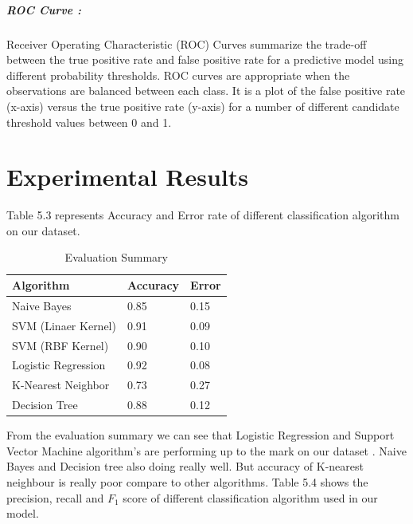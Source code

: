 \subparagraph{ROC Curve :}
Receiver Operating Characteristic (ROC) Curves summarize the trade-off between the true positive rate and false positive rate for a predictive model using different probability thresholds. ROC curves are appropriate when the observations are balanced between each class. It is a plot of the false positive rate (x-axis) versus the true positive rate (y-axis) for a number of different candidate threshold values between 0 and 1.

\section{Experimental Results}
Table 5.3 represents Accuracy and Error rate of different classification algorithm on our dataset.
\renewcommand{\arraystretch}{1.5}
\begin{table}[h!]
\begin{center}
\caption{Evaluation Summary}
\begin{tabular}{|m{7cm} | m{3cm}| m{3cm}|}
\hline
     Algorithm & Accuracy  & Error  \\
\hline
    Naive Bayes & 0.85 & 0.15\\
\hline 
    SVM (Linaer Kernel) & 0.91 & 0.09\\
\hline 
    SVM (RBF Kernel) & 0.90 & 0.10\\
\hline 
    Logistic Regression & 0.92 & 0.08\\
\hline
    K-Nearest Neighbor & 0.73 & 0.27\\
\hline
    Decision Tree & 0.88 & 0.12\\
\hline
\end{tabular}
\end{center}
\end{table}
\par
\noindent
From the evaluation summary we can see that Logistic Regression and Support Vector Machine algorithm's are performing up to the mark on our dataset . Naive Bayes and Decision tree also doing really well. But accuracy of K-nearest neighbour is really poor compare to other algorithms. 
\clearpage
\noindent
Table 5.4 shows the precision, recall and $F_1$ score of different classification algorithm used in our model.

